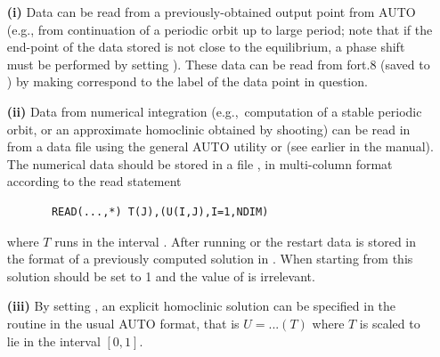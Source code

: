 \documentclass[12pt]{report}
\begin{document}
\begin{itemize}

\item[{\bf(i)}]
Data can be read from a previously-obtained output point from {\cal AUTO}
 (e.g., from continuation of a periodic orbit up to large period;
note that if the end-point of the data stored is not close to the
equilibrium, a phase shift must be performed by setting
). These data can be read from fort.8 (saved to ) by making  correspond to the label of the data
point in question.

\item[{\bf(ii)}]
Data from numerical integration (e.g.,\ computation of a stable
periodic orbit, or an approximate homoclinic obtained by shooting)  
can be read in from a data file using the general {\cal AUTO} 
utility  or  (see earlier in the manual). 
The  numerical data should be stored in
a file  , in multi-column format according to the read statement
\begin{verbatim}
       READ(...,*) T(J),(U(I,J),I=1,NDIM)
\end{verbatim}
where $T$ runs in the interval \parf{ [0,1]}.
After running  or  the restart data is stored in
the format of a previously computed solution in .
When starting from this solution  should be set to 1 and 
the value of  is irrelevant.

\item[{\bf(iii)}]
By setting ,  
an explicit homoclinic solution can be specified in the routine  
in the usual {\cal AUTO} format, that is 
$U=...(T)$ where $T$ is scaled to lie in the
interval $[0,1]$. 


\end{itemize}
\end{document}
